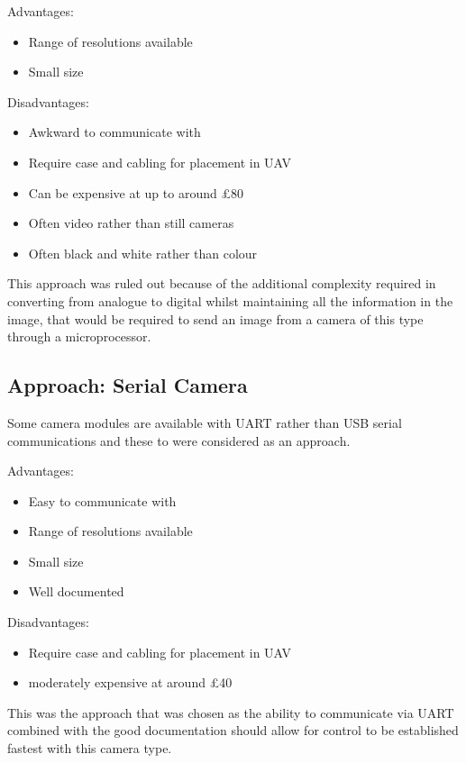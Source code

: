 Advantages:
      \begin{itemize}
         \item Range of resolutions available
		 \item Small size
     \end{itemize}

Disadvantages:
     \begin{itemize}
        \item Awkward to communicate with
        \item Require case and cabling for placement in UAV
		\item Can be expensive at up to around £80
		\item Often video rather than still cameras
		\item Often black and white rather than colour
     \end{itemize}

This approach was ruled out because of the additional complexity required in converting from analogue to digital whilst maintaining all the information in the image, that would be required to send an image from a camera of this type through a microprocessor.

\subsection{Approach: Serial Camera}
\label{sec:Serial_option}
Some camera modules are available with UART rather than USB serial communications and these to were considered as an approach.

Advantages:
      \begin{itemize}
		 \item Easy to communicate with
         \item Range of resolutions available
		 \item Small size
		 \item Well documented
     \end{itemize}

Disadvantages:
     \begin{itemize}
        \item Require case and cabling for placement in UAV
		\item moderately expensive at around £40
     \end{itemize}

This was the approach that was chosen as the ability to communicate via UART combined with the good documentation should allow for control to be established fastest with this camera type.